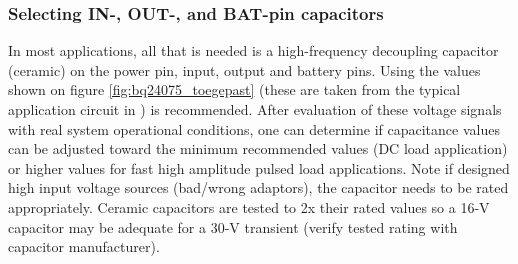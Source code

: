 \documentclass[11pt,a4paper]{article}
\begin{document}
\subsubsection{Selecting IN-, OUT-, and BAT-pin capacitors}\label{sec:BQ24075_caps}
In most applications, all that is needed is a high-frequency decoupling capacitor (ceramic) on the power pin, input, output and battery pins. Using the values shown on figure \ref{fig:bq24075_toegepast} (these are taken from the typical application circuit in \cite{bib:BQ24075}) is recommended. After evaluation of these voltage signals with real system operational conditions, one can determine if capacitance values can be adjusted toward the minimum recommended values (DC load application) or higher values for fast high amplitude pulsed load applications. Note if designed high input voltage sources (bad/wrong adaptors), the capacitor needs to be rated appropriately. Ceramic capacitors are tested to 2x their rated values so a 16-V capacitor may be adequate for a 30-V transient (verify tested rating with capacitor manufacturer).
\end{document}
